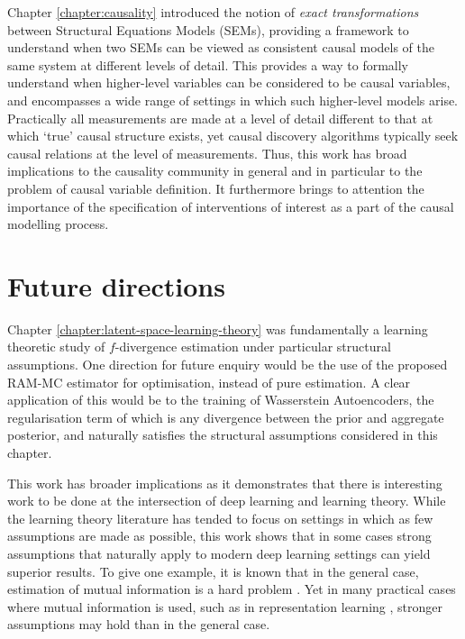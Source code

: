 Chapter \ref{chapter:causality} introduced the notion of \emph{exact transformations} between Structural Equations Models (SEMs), providing a framework to understand when two SEMs can be viewed as consistent causal models of the same system at different levels of detail. 
This provides a way to formally understand when higher-level variables can be considered to be causal variables, and encompasses a wide range of settings in which such higher-level models arise.
Practically all measurements are made at a level of detail different to that at which `true' causal structure exists, yet causal discovery algorithms typically seek causal relations at the level of measurements.
Thus, this work has broad implications to the causality community in general and in particular to the problem of causal variable definition.
It furthermore brings to attention the importance of the specification of interventions of interest as a part of the causal modelling process.


\section{Future directions}

Chapter \ref{chapter:latent-space-learning-theory} was fundamentally a learning theoretic study of $f$-divergence estimation under particular structural assumptions. 
One direction for future enquiry would be the use of the proposed RAM-MC estimator for optimisation, instead of pure estimation. 
A clear application of this would be to the training of Wasserstein Autoencoders, the regularisation term of which is any divergence between the prior and aggregate posterior, and naturally satisfies the structural assumptions considered in this chapter.

This work has broader implications as it demonstrates that there is interesting work to be done at the intersection of deep learning and learning theory. 
While the learning theory literature has tended to focus on settings in which as few assumptions are made as possible, this work shows that in some cases strong assumptions that naturally apply to modern deep learning settings can yield superior results.
To give one example, it is known that in the general case, estimation of mutual information is a hard problem \citep{mcallester2018formal}.
Yet in many practical cases where mutual information is used, such as in representation learning \citep{hjelm2018learning, oord2018representation, tschannen2020onmutual}, stronger assumptions may hold than in the general case.

